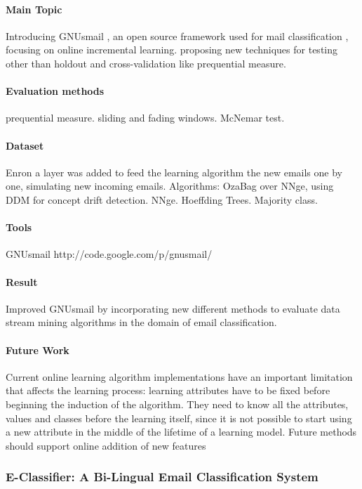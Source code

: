 \documentclass[12pt]{article}
\begin{document}
\paragraph{Main Topic}
Introducing GNUsmail , an open source framework used for mail classification , focusing on online incremental learning.
proposing new techniques for testing other than holdout and cross-validation like prequential measure.

\paragraph{Evaluation methods}
prequential measure.
sliding and fading windows.
McNemar test.

\paragraph{Dataset}
Enron
a layer was added to feed the learning algorithm the new emails one by one, simulating new incoming emails.
Algorithms:
OzaBag over NNge, using DDM for concept drift detection.
NNge.
Hoeffding Trees.
Majority class.
\paragraph{Tools}
GNUsmail
http://code.google.com/p/gnusmail/

\paragraph{Result}
Improved GNUsmail by incorporating new different methods to evaluate data stream mining algorithms in the domain of email classification.

\paragraph{Future Work}
Current online learning algorithm implementations have an important limitation that affects the learning process: learning attributes have to be fixed before beginning the induction of the algorithm. They need to know all the attributes, values and classes before the learning itself, since it is not possible to start using a new attribute in the middle of the lifetime of a learning model. Future methods should support online addition of new features




\subsubsection{E-Classifier: A Bi-Lingual Email Classification System}
\end{document}
